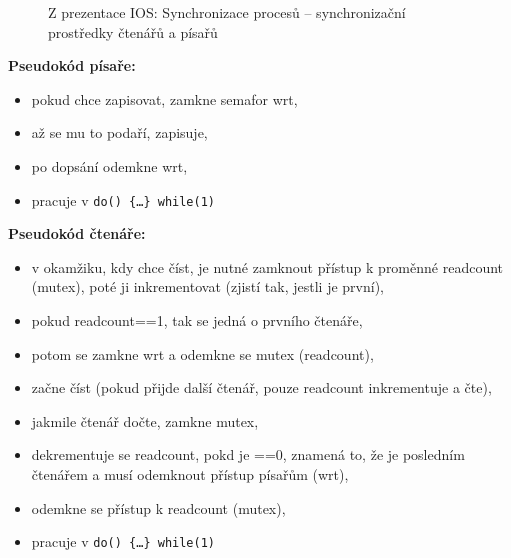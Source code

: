\documentclass[a4paper, 11pt]{article}
\newcommand{\tcmd}[1]{\texttt{#1}}
\begin{document}
\begin{figure} [ht]
    \centering
    \caption{Z prezentace IOS: Synchronizace procesů -- synchronizační prostředky čtenářů a písařů}
\end{figure}

\textbf{Pseudokód písaře:}
\begin{itemize}
 \item pokud chce zapisovat, zamkne semafor wrt,
 \item až se mu to podaří, zapisuje,
 \item po dopsání odemkne wrt,
 \item pracuje v \tcmd{do() \{\ldots\} while(1)}
\end{itemize}

\textbf{Pseudokód čtenáře:}
\begin{itemize}
 \item v okamžiku, kdy chce číst, je nutné zamknout přístup k proměnné readcount (mutex), poté ji inkrementovat (zjistí tak, jestli je první),
 \item pokud readcount==1, tak se jedná o prvního čtenáře,
 \item potom se zamkne wrt a odemkne se mutex (readcount),
 \item začne číst (pokud přijde další čtenář, pouze readcount inkrementuje a čte),
 \item jakmile čtenář dočte, zamkne mutex,
 \item dekrementuje se readcount, pokd je ==0, znamená to, že je posledním čtenářem a musí odemknout přístup písařům (wrt),
 \item odemkne se přístup k readcount (mutex),
 \item pracuje v \tcmd{do() \{\ldots\} while(1)}
\end{itemize}
\end{document}
